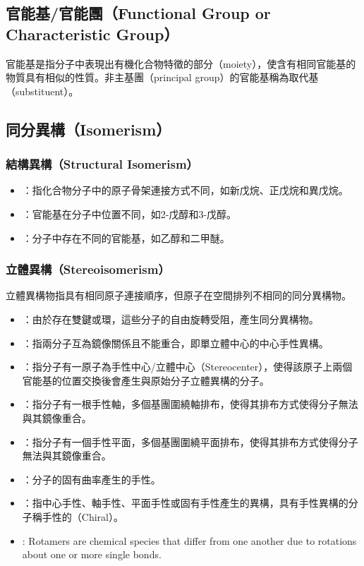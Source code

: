 \documentclass[a4paper,12pt]{report}
\begin{document}
\subsection{官能基/官能團（Functional Group or Characteristic Group）}
官能基是指分子中表現出有機化合物特徵的部分（moiety），使含有相同官能基的物質具有相似的性質。非主基團（principal group）的官能基稱為取代基（substituent）。
\subsection{同分異構（Isomerism）}
\subsubsection{結構異構（Structural Isomerism）}
\begin{itemize}
\item {}：指化合物分子中的原子骨架連接方式不同，如新戊烷、正戊烷和異戊烷。
\item {}：官能基在分子中位置不同，如2-戊醇和3-戊醇。
\item {}：分子中存在不同的官能基，如乙醇和二甲醚。
\end{itemize}
\subsubsection{立體異構（Stereoisomerism）}
立體異構物指具有相同原子連接順序，但原子在空間排列不相同的同分異構物。
\begin{itemize}
\item {}：由於存在雙鍵或環，這些分子的自由旋轉受阻，產生同分異構物。
\item {}：指兩分子互為鏡像關係且不能重合，即單立體中心的中心手性異構。
\item {}：指分子有一原子為手性中心/立體中心（Stereocenter），使得該原子上兩個官能基的位置交換後會產生與原始分子立體異構的分子。
\item {}：指分子有一根手性軸，多個基團圍繞軸排布，使得其排布方式使得分子無法與其鏡像重合。
\item {}：指分子有一個手性平面，多個基團圍繞平面排布，使得其排布方式使得分子無法與其鏡像重合。
\item {}：分子的固有曲率產生的手性。
\item {}：指中心手性、軸手性、平面手性或固有手性產生的異構，具有手性異構的分子稱手性的（Chiral）。
\item {}: Rotamers are chemical species that differ from one another due to rotations about one or more single bonds.
\end{itemize}
\end{document}
